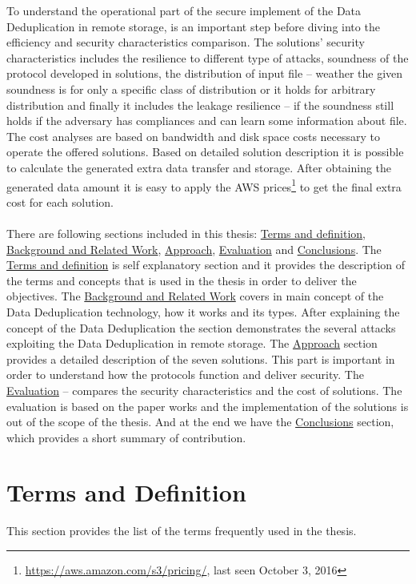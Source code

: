 \documentclass[12pt]{article}
\begin{document}
To understand the operational part of the secure implement of the Data Deduplication in remote storage, is an important step before diving into the efficiency and security characteristics comparison. The solutions' security characteristics includes the resilience to different type of attacks, soundness of the protocol developed in solutions, the distribution of input file --  weather the given soundness is for only a specific class of distribution or it holds for arbitrary distribution and finally it includes the leakage resilience -- if the soundness still holds if the adversary has compliances and can learn some information about file. The cost analyses are based on bandwidth and disk space costs necessary to operate the offered solutions. Based on detailed solution description it is possible to calculate the generated extra data transfer and storage. After obtaining the generated data amount it is easy to apply the  AWS prices\footnote{\url{https://aws.amazon.com/s3/pricing/}, last seen October 3, 2016} to get the final extra cost for each solution.\\\\
There are following sections included in this thesis: \hyperref[sec:2]{Terms and definition}, \hyperref[sec:3]{Background and Related Work}, \hyperref[sec:4]{Approach}, \hyperref[sec:5]{Evaluation} and \hyperref[sec:6]{Conclusions}. The \hyperref[sec:2]{Terms and definition} is self explanatory section and it provides the description of the terms and concepts that is used in the thesis in order to deliver the objectives. The  \hyperref[sec:3]{Background and Related Work} covers in main concept of the Data Deduplication technology, how it works and its types. After explaining the concept of the Data Deduplication the section demonstrates the several attacks exploiting the Data Deduplication in remote storage. The  \hyperref[sec:4]{Approach} section provides a detailed description of the seven solutions. This part is important in order to understand  how the protocols function and deliver security. The \hyperref[sec:5]{Evaluation} -- compares the security characteristics and the cost of solutions. The evaluation is based on the paper works and the implementation of the solutions is out of the scope of the thesis. And at the end we have the \hyperref[sec:6]{Conclusions} section, which provides a short summary of contribution.
\pagebreak
\section{Terms and Definition}
\label{sec:2}
This section provides the list of the terms  frequently  used in the thesis. 
\end{document}
